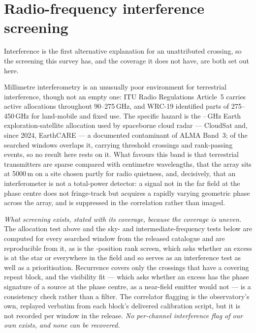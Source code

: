 \section{Radio-frequency interference screening}
\label{app:rfi}

Interference is the first alternative explanation for an unattributed
crossing, so the screening this survey has, and the coverage it does not
have, are both set out here.

Millimetre interferometry is an unusually poor environment for terrestrial
interference, though not an empty one: ITU Radio Regulations Article~5
\citep{ITU2024} carries active allocations throughout 90--275\,GHz, and WRC-19 identified
parts of 275--450\,GHz for land-mobile and fixed use. The specific hazard is
the \RadarLo--\RadarHi\,GHz Earth exploration-satellite allocation used by
spaceborne cloud radar --- CloudSat and, since 2024, EarthCARE
\citep{CloudSat2002,EarthCARE2023} --- a
documented contaminant of ALMA Band~3; \RadarNWin{} of the \RadarNTot{}
searched windows overlaps it, carrying \RadarNCross{} threshold crossings and
\RadarNStage{} rank-passing events, so no result here rests on it. What
favours this band is that terrestrial transmitters are sparse compared with
centimetre wavelengths, that the array sits at 5000\,m on a site chosen
partly for radio quietness, and, decisively, that an interferometer is not a
total-power detector: a signal not in the far field at the phase centre does
not fringe-track but acquires a rapidly varying geometric phase across the
array, and is suppressed in the correlation rather than imaged.

\emph{What screening exists, stated with its coverage, because the coverage
is uneven.} The allocation test above and the sky- and
intermediate-frequency tests below are computed for every searched window
from the released catalogue and are reproducible from it, as is the
\NCtrl-position rank screen, which asks whether an excess is at the star or
everywhere in the field and so serves as an interference test as well as a
prioritisation. Recurrence covers only the crossings that have a covering
repeat block, and the visibility fit --- which asks whether an excess has
the phase signature of a source at the phase centre, as a near-field emitter
would not --- is a consistency check rather than a filter. The correlator
flagging is the observatory's own, replayed verbatim from each block's
delivered calibration script, but it is not recorded per window in the
release. \emph{No per-channel interference flag of our own exists, and none
can be recovered.}

